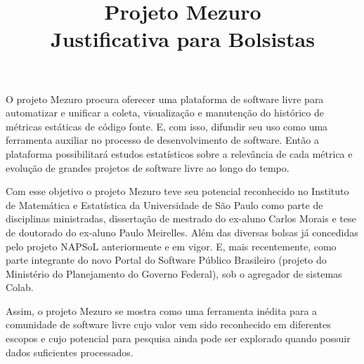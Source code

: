 \documentclass[12pt]{article}
\begin{document}
  \title{Projeto Mezuro\\
         Justificativa para Bolsistas}

  \maketitle

  O projeto Mezuro procura oferecer uma plataforma de software livre para automatizar e unificar a coleta, visualização e manutenção do histórico de métricas estáticas de código fonte. E, com isso, difundir seu uso como uma ferramenta auxiliar no processo de desenvolvimento de software. Então a plataforma possibilitará estudos estatísticos sobre a relevância de cada métrica e evolução de grandes projetos de software livre ao longo do tempo.

  Com esse objetivo o projeto Mezuro teve seu potencial reconhecido no Instituto de Matemática e Estatística da Universidade de São Paulo como parte de disciplinas ministradas, dissertação de mestrado do ex-aluno Carlos Morais e tese de doutorado do ex-aluno Paulo Meirelles. Além das diversas bolsas já concedidas pelo projeto NAPSoL anteriormente e em vigor. E, mais recentemente, como parte integrante do novo Portal do Software Público Brasileiro (projeto do Ministério do Planejamento do Governo Federal), sob o agregador de sistemas Colab.

  Assim, o projeto Mezuro se mostra como uma ferramenta inédita para a comunidade de software livre cujo valor vem sido reconhecido em diferentes escopos e cujo potencial para pesquisa ainda pode ser explorado quando possuir dados suficientes processados.
\end{document}
